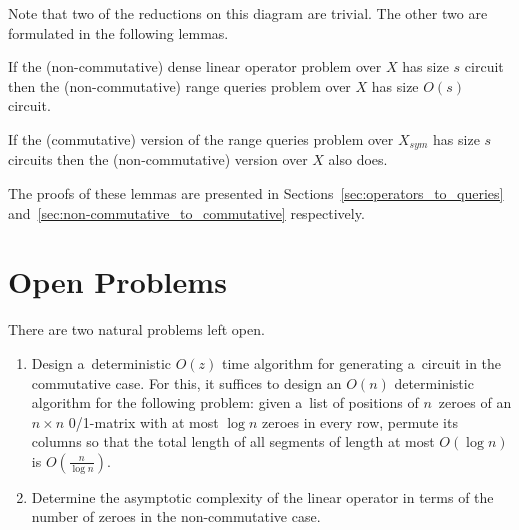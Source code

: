 \documentclass[review,onefignum,onetabnum]{siamart190516}
\begin{document}
Note that two of the reductions on this diagram are trivial. The other two are formulated in the following lemmas.


%
%

\begin{lemma} \label{lem:dense_matrices}
If the (non-commutative) dense linear operator problem over $X$ has size $s$ circuit then the (non-commutative) range queries problem over $X$ has size $O(s)$ circuit.
\end{lemma}

\begin{lemma} \label{lem:intervals}
If the (commutative) version of the range queries problem over $X_{sym}$ has size $s$ circuits then the (non-commutative) version over $X$ also does.
\end{lemma}

The proofs of these lemmas are presented in Sections~\ref{sec:operators_to_queries}
and~\ref{sec:non-commutative_to_commutative} respectively.





\section{Open Problems}
There are two natural problems left open.
\begin{enumerate}
\item Design a~deterministic $O(z)$ time algorithm for generating
a~circuit in the commutative case.
For this, it suffices to design an $O(n)$ deterministic algorithm for the following problem: given a~list of positions
of $n$~zeroes of an $n \times n$ 0/1-matrix with at most $\log n$ zeroes in every row, permute its columns so that the total length of all segments of length at most $O(\log n)$ is $O(\frac{n}{\log n})$.
\item Determine the asymptotic complexity of the linear operator in terms of the number of zeroes in the non-commutative case.
\end{enumerate}
\end{document}
